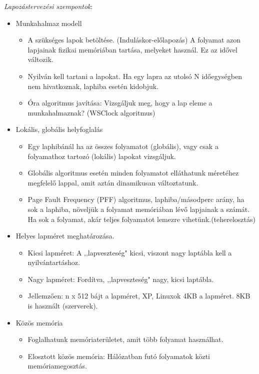 \documentclass[margin=0px]{article}
\begin{document}
\textit{Lapozástervezési szempontok}:
\begin{itemize}
    \item Munkahalmaz modell
          \begin{itemize}
              \item A szükséges lapok betöltése. (Induláskor-előlapozás) A folyamat azon lapjainak fizikai memóriában tartása, melyeket használ. Ez az idővel változik.
              \item Nyilván kell tartani a lapokat. Ha egy lapra az utolsó N időegységben nem hivatkoznak, laphiba esetén kidobjuk.
              \item Óra algoritmus javítása: Vizsgáljuk meg, hogy a lap eleme a munkahalmaznak? (WSClock algoritmus)
          \end{itemize}
    \item Lokális, globális helyfoglalás
          \begin{itemize}
              \item Egy laphibánál ha az összes folyamatot (globális), vagy csak a folyamathoz tartozó (lokális) lapokat vizsgáljuk.
              \item Globális algoritmus esetén minden folyamatot elláthatunk méretéhez megfelelő lappal, amit aztán dinamikusan változtatunk.
              \item Page Fault Frequency (PFF) algoritmus, laphiba/másodperc arány, ha sok a laphiba, növeljük a folyamat memóriában lévő lapjainak a számát. Ha sok a folyamat, akár teljes folyamatot lemezre vihetünk.(teherelosztás)
          \end{itemize}
    \item Helyes lapméret meghatározása.
          \begin{itemize}
              \item Kicsi lapméret: A ,,lapveszteség" kicsi, viszont nagy laptábla kell a nyilvántartáshoz.
              \item Nagy lapméret: Fordítva, ,,lapveszteség" nagy, kicsi laptábla.
              \item Jellemzően: n x 512 bájt a lapméret, XP, Linuxok 4KB a lapméret. 8KB is használt (szerverek).
          \end{itemize}
    \item Közös memória
          \begin{itemize}
              \item Foglalhatunk memóriaterületet, amit több folyamat használhat.
              \item Elosztott közös memória: Hálózatban futó folyamatok közti memóriamegosztás.
          \end{itemize}
\end{itemize}
\end{document}
